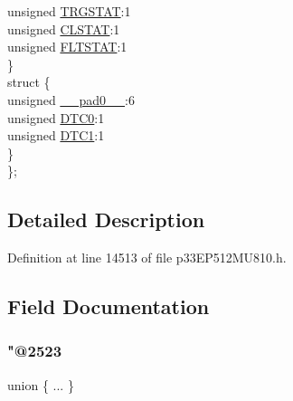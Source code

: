 \begin{DoxyCompactItemize}
\begin{tabbing}
\>\>unsigned \hyperlink{structtag_p_w_m_c_o_n3_b_i_t_s_a57c6135a12bae69a2a2cac5ed50a4a6d}{TRGSTAT}:1\\
\>\>unsigned \hyperlink{structtag_p_w_m_c_o_n3_b_i_t_s_a3ff6da0b6372a30fc64f07d769a3ddab}{CLSTAT}:1\\
\>\>unsigned \hyperlink{structtag_p_w_m_c_o_n3_b_i_t_s_ac4cd94e1f740f5bc85b265ed453769f0}{FLTSTAT}:1\\
\>\} \\
\>struct \{\\
\>\>unsigned \hyperlink{structtag_p_w_m_c_o_n3_b_i_t_s_adf71f3d8410c1f1dbbc96680a92c49af}{\_\_pad0\_\_}:6\\
\>\>unsigned \hyperlink{structtag_p_w_m_c_o_n3_b_i_t_s_a9aea5589386f8c7d9cb07683fc730825}{DTC0}:1\\
\>\>unsigned \hyperlink{structtag_p_w_m_c_o_n3_b_i_t_s_a41e45e30f2c99c731b1d2bca6060d8ad}{DTC1}:1\\
\>\} \\
\}; \\

\end{tabbing}\end{DoxyCompactItemize}


\subsection{Detailed Description}


Definition at line 14513 of file p33\+E\+P512\+M\+U810.\+h.



\subsection{Field Documentation}
\mbox{\label{structtag_p_w_m_c_o_n3_b_i_t_s_ad604b830998b3c62d28ff6662b0fa033}} 
\subsubsection{\texorpdfstring{"@2523}{@2523}}
{\footnotesize\ttfamily union \{ ... \} }

\mbox{\label{structtag_p_w_m_c_o_n3_b_i_t_s_adf71f3d8410c1f1dbbc96680a92c49af}} 
